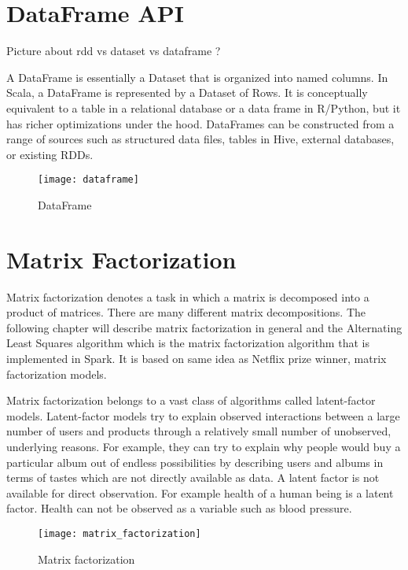 \documentclass[main.tex]{thesis.tex}
\begin{document}
\section{DataFrame API}

Picture about rdd vs dataset vs dataframe ?

A DataFrame is essentially a Dataset that is organized into named columns.
In Scala, a DataFrame is represented by a Dataset of Rows.
It is conceptually equivalent to a table in a relational database or a data frame in R/Python, but it has richer optimizations under the hood.
DataFrames can be constructed from a range of sources such as structured data files, tables in Hive, external databases, or existing RDDs.
\cite{spark-sql-programming-guide}

\begin{figure}[h]
	\caption{DataFrame}
	\centering
	\texttt{[image: dataframe]}
\end{figure}

\section{Matrix Factorization}

Matrix factorization denotes a task in which a matrix is decomposed into a product of matrices.
There are many different matrix decompositions.
The following chapter will describe matrix factorization in general and the Alternating Least Squares algorithm which is the matrix factorization algorithm that is implemented in Spark.
It is based on same idea as Netflix prize winner, matrix factorization models.

Matrix factorization belongs to a vast class of algorithms called latent-factor models.
Latent-factor models try to explain observed interactions between a large number of users and products through a relatively small number of unobserved, underlying reasons.
For example, they can try to explain why people would buy a particular album out of endless possibilities by describing users and albums in terms of tastes which are not directly available as data. \cite{ryza15}
A latent factor is not available for direct observation. For example health of a human being is a latent factor.
Health can not be observed as a variable such as blood pressure.

\begin{figure}[h]
	\caption{Matrix factorization \cite{ryza15}}
	\centering
	\texttt{[image: matrix\_factorization]}
\end{figure}
\end{document}
